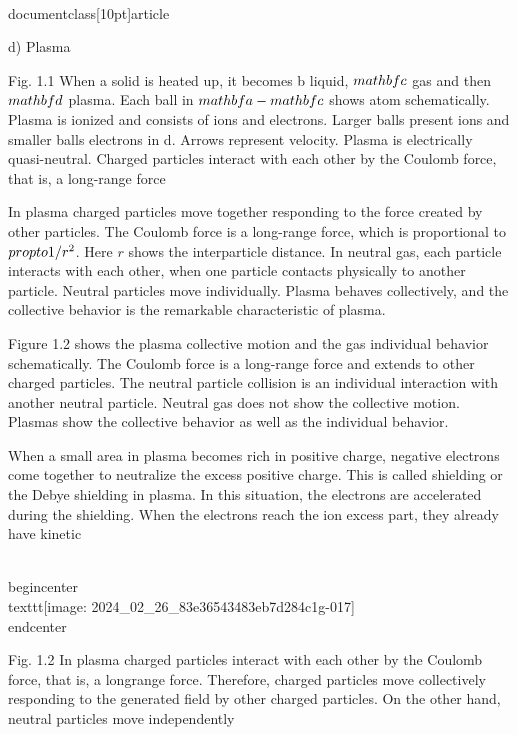 \\documentclass[10pt]{article}
\begin{document}
d) Plasma

Fig. 1.1 When a solid is heated up, it becomes b liquid, $\\mathbf{c}$ gas and then $\\mathbf{d}$ plasma. Each ball in $\\mathbf{a}-\\mathbf{c}$ shows atom schematically. Plasma is ionized and consists of ions and electrons. Larger balls present ions and smaller balls electrons in d. Arrows represent velocity. Plasma is electrically quasi-neutral. Charged particles interact with each other by the Coulomb force, that is, a long-range force

In plasma charged particles move together responding to the force created by other particles. The Coulomb force is a long-range force, which is proportional to $\\propto 1 / r^{2}$. Here $r$ shows the interparticle distance. In neutral gas, each particle interacts with each other, when one particle contacts physically to another particle. Neutral particles move individually. Plasma behaves collectively, and the collective behavior is the remarkable characteristic of plasma.

Figure 1.2 shows the plasma collective motion and the gas individual behavior schematically. The Coulomb force is a long-range force and extends to other charged particles. The neutral particle collision is an individual interaction with another neutral particle. Neutral gas does not show the collective motion. Plasmas show the collective behavior as well as the individual behavior.

When a small area in plasma becomes rich in positive charge, negative electrons come together to neutralize the excess positive charge. This is called shielding or the Debye shielding in plasma. In this situation, the electrons are accelerated during the shielding. When the electrons reach the ion excess part, they already have kinetic

\\begin{center}
\\texttt{[image: 2024\_02\_26\_83e36543483eb7d284c1g-017]}
\\end{center}

Fig. 1.2 In plasma charged particles interact with each other by the Coulomb force, that is, a longrange force. Therefore, charged particles move collectively responding to the generated field by other charged particles. On the other hand, neutral particles move independently
\end{document}
